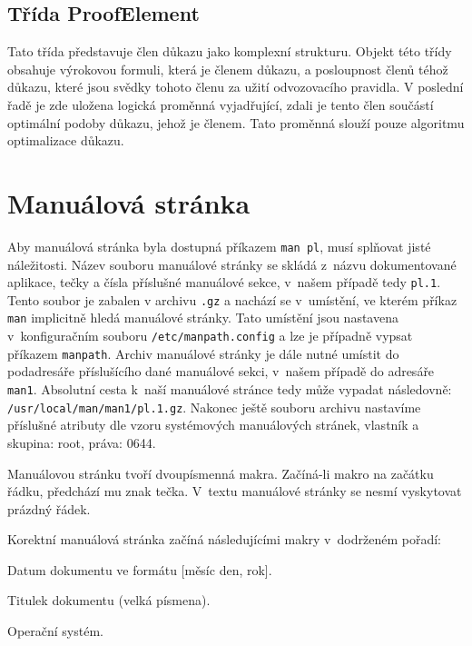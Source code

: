 \documentclass[thesis=B,czech,hidelinks]{thesis}[2012/06/26]
\begin{document}
\subsection{Třída ProofElement}

Tato třída představuje člen důkazu jako komplexní strukturu. Objekt této třídy obsahuje výrokovou formuli, která je členem důkazu, a posloupnost členů téhož důkazu, které jsou svědky tohoto členu za užití odvozovacího pravidla. V poslední řadě je zde uložena logická proměnná vyjadřující, zdali je tento člen součástí optimální podoby důkazu, jehož je členem. Tato proměnná slouží pouze algoritmu optimalizace důkazu.

\section{Manuálová stránka}

Aby manuálová stránka byla dostupná příkazem \texttt{man pl}, musí splňovat jisté náležitosti. Název souboru manuálové stránky se skládá z~názvu dokumentované aplikace, tečky a čísla příslušné manuálové sekce, v~našem případě tedy \texttt{pl.1}. Tento soubor je zabalen v archivu \texttt{.gz} a nachází se v~umístění, ve kterém příkaz \texttt{man} implicitně hledá manuálové stránky. Tato umístění jsou nastavena v~konfiguračním souboru \texttt{/etc/manpath.config} a lze je případně vypsat příkazem \texttt{manpath}. Archiv manuálové stránky je dále nutné umístit do podadresáře příslušícího dané manuálové sekci, v~našem případě do adresáře \texttt{man1}. Absolutní cesta k~naší manuálové stránce tedy může vypadat následovně: \texttt{/usr/local/man/man1/pl.1.gz}. Nakonec ještě souboru archivu nastavíme příslušné atributy dle vzoru systémových manuálových stránek, vlastník a skupina: root, práva: 0644.

Manuálovou stránku tvoří dvoupísmenná makra. Začíná-li makro na začátku řádku, předchází mu znak tečka. V~textu manuálové stránky se nesmí vyskytovat prázdný řádek.

Korektní manuálová stránka začíná následujícími makry v~dodrženém pořadí:

\begin{description}
\centering
	\item[Dd] Datum dokumentu ve formátu [měsíc den, rok].
	\item[Dt] Titulek dokumentu (velká písmena).
	\item[Os] Operační systém.
\end{description}
\end{document}
